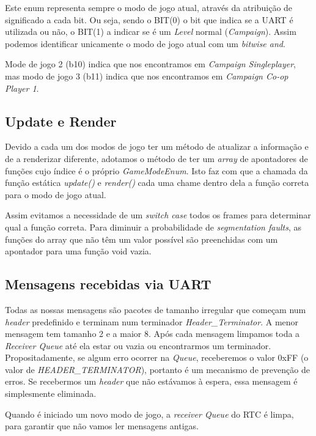 \documentclass{report}
\begin{document}
Este enum representa sempre o modo de jogo atual, através da atribuição de significado a cada bit. Ou seja, sendo o BIT(0) o bit que indica se a UART é utilizada ou não, o BIT(1) a indicar se é um \textit{Level} normal (\textit{Campaign}). Assim podemos identificar unicamente o modo de jogo atual com um \textit{bitwise and}.

Mode de jogo 2 (b10) indica que nos encontramos em \textit{Campaign Singleplayer}, mas modo de jogo 3 (b11) indica que nos encontramos em \textit{Campaign Co-op Player 1}.

\subsection{Update e Render}

Devido a cada um dos modos de jogo ter um método de atualizar a informação e de a renderizar diferente, adotamos o método de ter um \textit{array} de apontadores de funções cujo índice é o próprio \textit{GameModeEnum}. Isto faz com que a chamada da função estática \textit{update()} e \textit{render()} cada uma chame dentro dela a função correta para o modo de jogo atual.

Assim evitamos a necessidade de um \textit{switch case} todos os frames para determinar qual a função correta. Para diminuir a probabilidade de \textit{segmentation faults}, as funções do array que não têm um valor possível são preenchidas com um apontador para uma função void vazia.

\subsection{Mensagens recebidas via UART}

Todas as nossas mensagens são pacotes de tamanho irregular que começam num \textit{header} predefinido e terminam num terminador \textit{Header\_Terminator}. A menor mensagem tem tamanho 2 e a maior 8. Após cada mensagem limpamos toda a \textit{Receiver Queue} até ela estar ou vazia ou encontrarmos um terminador. Propositadamente, se algum erro ocorrer na \textit{Queue}, receberemos o valor 0xFF (o valor de \textit{HEADER\_TERMINATOR}), portanto é um mecanismo de prevenção de erros. Se recebermos um \textit{header} que não estávamos à espera, essa mensagem é simplesmente eliminada.

Quando é iniciado um novo modo de jogo, a \textit{receiver Queue} do RTC é limpa, para garantir que não vamos ler mensagens antigas.
\end{document}
